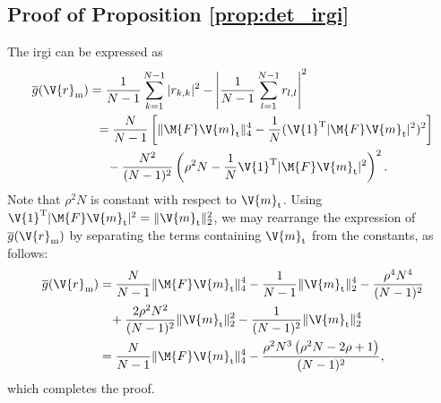 \documentclass[journal,a4paper,10pt, romanappendices]{IEEEtran}
\begin{document}
\subsection{Proof of Proposition \ref{prop:det_irgi}}\label{sec:proof_det_irgi}
\begin{IEEEproof}
The \ac{irgi} can be expressed as
\begin{align}
\overline{g}(\V{r}_{\rm m})&= \frac{1}{N-1}\sum_{k=1}^{N-1} |r_{k,k}|^2 - \left|\frac{1}{N-1} \sum_{l=1}^{N-1} r_{l,l}\right|^2\nonumber\\
&\hspace{2mm}= \frac{N}{N-1}\left[\|\M{F}\V{m}_{\rm t}\|_4^4 -\frac{1}{N}(\V{1}^{\rm T}|\M{F}\V{m}_{\rm t}|^2)^2\right] \nonumber\\
&\hspace{5mm}- \frac{N^2}{(N-1)^2} \left(\rho^2N-\frac{1}{N}\V{1}^{\rm T}|\M{F}\V{m}_{\rm t}|^2\right)^2.
\end{align}
Note that $\rho^2 N$ is constant with respect to $\V{m}_{\rm t}$. Using $\V{1}^{\rm T}|\M{F}\V{m}_{\rm t}|^2=\|\V{m}_{\rm t}\|_2^2$, we may rearrange the expression of $\overline{g}(\V{r}_{\rm m})$ by separating the terms containing $\V{m}_{\rm t}$ from the constants, as follows:
\begin{align}\label{irgi_cm}
\overline{g}(\V{r}_{\rm m}) &= \frac{N}{N-1}\|\M{F}\V{m}_{\rm t}\|_4^4-\frac{1}{N-1}\|\V{m}_{\rm t}\|_2^4-\frac{\rho^4 N^4}{(N-1)^2}\nonumber\\
&\hspace{3mm}+\frac{2\rho^2 N^2}{(N-1)^2}\|\V{m}_{\rm t}\|_2^2-\frac{1}{(N-1)^2}\|\V{m}_{\rm t}\|_2^4\nonumber\\
&=\frac{N}{N-1}\|\M{F}\V{m}_{\rm t}\|_4^4-\frac{\rho^2 N^3\left(\rho^2N-2\rho+1\right)}{(N-1)^2},
\end{align}
which completes the proof.
\end{IEEEproof}
\end{document}
